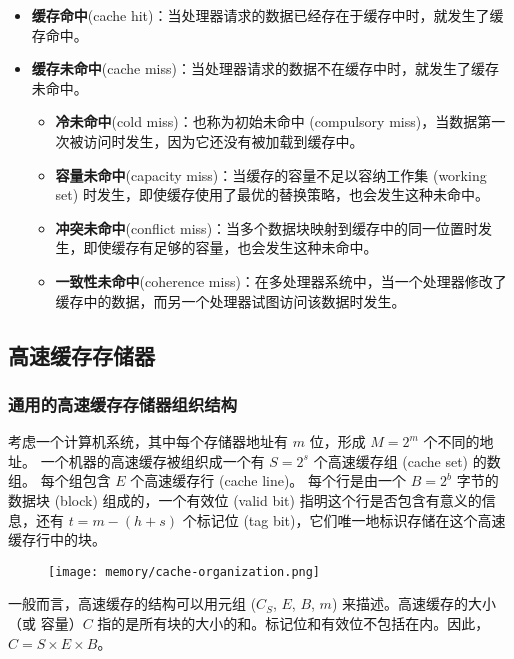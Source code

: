 \begin{itemize}
    \item \textbf{缓存命中}(cache hit)：当处理器请求的数据已经存在于缓存中时，就发生了缓存命中。
    \item \textbf{缓存未命中}(cache miss)：当处理器请求的数据不在缓存中时，就发生了缓存未命中。
          \begin{itemize}
              \item \textbf{冷未命中}(cold miss)：也称为初始未命中 (compulsory miss)，当数据第一次被访问时发生，因为它还没有被加载到缓存中。
              \item \textbf{容量未命中}(capacity miss)：当缓存的容量不足以容纳工作集 (working set) 时发生，即使缓存使用了最优的替换策略，也会发生这种未命中。
              \item \textbf{冲突未命中}(conflict miss)：当多个数据块映射到缓存中的同一位置时发生，即使缓存有足够的容量，也会发生这种未命中。
              \item \textbf{一致性未命中}(coherence miss)：在多处理器系统中，当一个处理器修改了缓存中的数据，而另一个处理器试图访问该数据时发生。
          \end{itemize}
\end{itemize}

\subsection{高速缓存存储器}
\subsubsection{通用的高速缓存存储器组织结构}

考虑一个计算机系统，其中每个存储器地址有 $m$ 位，形成 $M=2^m$ 个不同的地址。
一个机器的高速缓存被组织成一个有 $S=2^s$ 个高速缓存组 (cache set) 的数组。
每个组包含 $E$ 个高速缓存行 (cache line)。
每个行是由一个 $B=2^b$ 字节的数据块 (block) 组成的，一个有效位 (valid bit) 指明这个行是否包含有意义的信息，还有 $t=m-(h+s)$ 个标记位 (tag bit)，它们唯一地标识存储在这个高速缓存行中的块。

\begin{figure}[H]
    \centering
    \texttt{[image: memory/cache-organization.png]}
\end{figure}

一般而言，高速缓存的结构可以用元组 ($C_S$, $E$, $B$, $m$) 来描述。高速缓存的大小（或
容量）$C$ 指的是所有块的大小的和。标记位和有效位不包括在内。因此，$C=S \times E \times B$。

